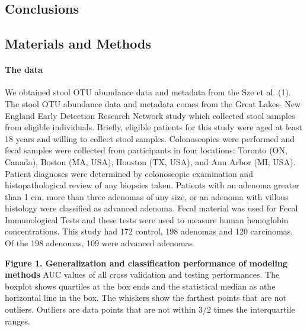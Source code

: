 \documentclass[11pt,]{article}
\let\oldparagraph\paragraph
\renewcommand{\paragraph}[1]{\oldparagraph{#1}\mbox{}}
\begin{document}
\subsection{Conclusions}\label{conclusions}

\subsection{Materials and Methods}\label{materials-and-methods}

\paragraph{The data}\label{the-data}

We obtained stool OTU abundance data and metadata from the Sze et al.
(1). The stool OTU abundance data and metadata comes from the Great
Lakes- New England Early Detection Research Network study which
collected stool samples from eligible individuals. Briefly, eligible
patients for this study were aged at least 18 years and willing to
collect stool samples. Colonoscopies were performed and fecal samples
were collected from participants in four locations: Toronto (ON,
Canada), Boston (MA, USA), Houston (TX, USA), and Ann Arbor (MI, USA).
Patient diagnoses were determined by colonoscopic examination and
histopathological review of any biopsies taken. Patients with an adenoma
greater than 1 cm, more than three adenomas of any size, or an adenoma
with villous histology were classified as advanced adenoma. Fecal
material was used for Fecal Immunological Tests and these tests were
used to measure human hemoglobin concentrations. This study had 172
control, 198 adenomas and 120 carcinomas. Of the 198 adenomas, 109 were
advanced adenomas.

\newpage

\textbf{Figure 1. Generalization and classification performance of
modeling methods } AUC values of all cross validation and testing
performances. The boxplot shows quartiles at the box ends and the
statistical median as athe horizontal line in the box. The whiskers show
the farthest points that are not outliers. Outliers are data points that
are not within 3/2 times the interquartile ranges.
\end{document}
